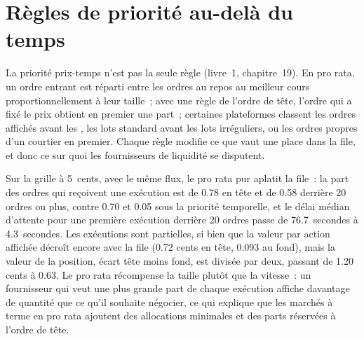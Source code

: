 \section{Règles de priorité au-delà du temps}

La priorité prix-temps n'est pas la seule règle (livre~1, chapitre~19). En pro rata, un ordre entrant est réparti entre les ordres au repos au meilleur cours
proportionnellement à leur taille~; avec une règle de l'ordre de tête, l'ordre qui a fixé le prix obtient en premier une part~; certaines plateformes classent les ordres affichés avant les , les lots
standard avant les lots irréguliers, ou les ordres propres d'un courtier en premier. Chaque règle modifie ce que vaut une place dans la file, et donc ce sur quoi les fournisseurs de liquidité se disputent.

Sur la grille à 5~cents, avec le même flux, le pro rata pur aplatit la file~: la part des ordres qui reçoivent une exécution est de 0.78 en tête et de 0.58
derrière 20 ordres ou plus, contre 0.70 et 0.05 sous la priorité temporelle, et le délai médian d'attente pour une première exécution derrière 20 ordres passe de 76.7~secondes à
4.3~secondes. Les exécutions sont partielles, si bien que la valeur par action affichée décroît encore avec la file (0.72 cents en tête, 0.093 au fond), mais la valeur de la position,
écart tête moins fond, est divisée par deux, passant de 1.20 cents à 0.63. Le pro rata récompense la taille plutôt que la vitesse~: un fournisseur qui veut une plus grande part de chaque exécution affiche davantage de quantité
que ce qu'il souhaite négocier, ce qui explique que les marchés à terme en pro rata ajoutent des allocations minimales et des parts réservées à l'ordre de tête.

